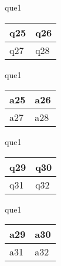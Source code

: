 \documentclass[13.5pt, varwidth=true]{beamer}
\begin{document}
\begin{frame}[shrink=19,fragile]
	\begin{beamercolorbox}[rounded=true, left, shadow=true,wd=14.8cm]{que1}
		\begin{tabular}{p{7cm} | p{7cm}}
			\parbox{7cm}{q25 } & \parbox{7cm}{q26 } \\ 
			\hline
			\parbox{7cm}{q27 } & \parbox{7cm}{q28 } \\
		\end{tabular}
	\end{beamercolorbox}
\end{frame}
\begin{frame}[shrink=19,fragile]
	\begin{beamercolorbox}[rounded=true, left, shadow=true,wd=14.8cm]{que1}
		\begin{tabular}{p{7cm} | p{7cm}}
			\textcolor{ared}{a25 }  & \textcolor{ared}{a26 } \\ 
			\hline
			\textcolor{ared}{a27 }  & \textcolor{ared}{a28 } \\
		\end{tabular}
	\end{beamercolorbox}
\end{frame}

\begin{frame}[shrink=19,fragile]
	\begin{beamercolorbox}[rounded=true, left, shadow=true,wd=14.8cm]{que1}
		\begin{tabular}{p{7cm} | p{7cm}}
			\parbox{7cm}{q29 } & \parbox{7cm}{q30 } \\ 
			\hline
			\parbox{7cm}{q31 } & \parbox{7cm}{q32 } \\
		\end{tabular}
	\end{beamercolorbox}
\end{frame}
\begin{frame}[shrink=19,fragile]
	\begin{beamercolorbox}[rounded=true, left, shadow=true,wd=14.8cm]{que1}
		\begin{tabular}{p{7cm} | p{7cm}}
			\textcolor{ared}{a29 }  & \textcolor{ared}{a30 } \\ 
			\hline
			\textcolor{ared}{a31 }  & \textcolor{ared}{a32 } \\
		\end{tabular}
	\end{beamercolorbox}
\end{frame}
\end{document}
